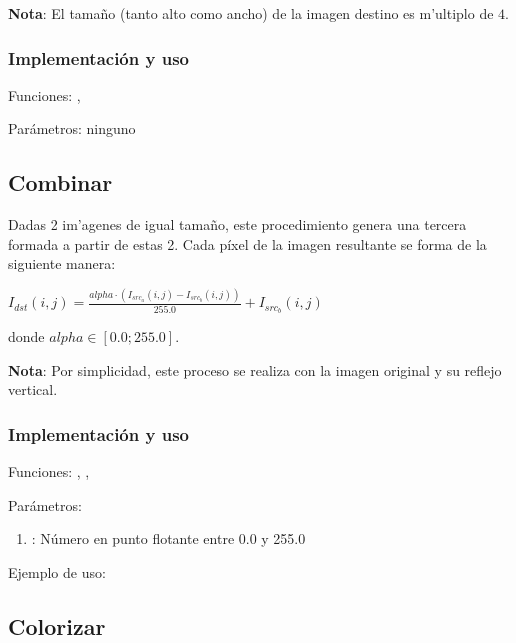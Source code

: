 \begin{framed}
  \noindent \textbf{Nota}: El tama\~no (tanto alto como ancho) de la imagen 
  destino es m'ultiplo de $4$.
\end{framed}

\subsubsection*{Implementación y uso}

\noindent Funciones: , 

\noindent Parámetros: ninguno

\subsection{Combinar}

Dadas 2 im'agenes de igual tama\~no, este procedimiento genera una tercera 
formada a partir de estas 2. Cada píxel de la imagen resultante se forma de la 
siguiente manera:

\begin{center}
  $ I_{dst}(i,j) =  \frac{alpha \cdot (I_{src_{a}}(i,j) - 
    I_{src_{b}}(i,j))}{255.0} + I_{src_{b}}(i,j) $
\end{center}

donde $alpha \in [0.0; 255.0]$.\\

\begin{framed}
  \noindent \textbf{Nota}: Por simplicidad, este proceso se realiza con la 
  imagen original y su reflejo vertical.
\end{framed}

\subsubsection*{Implementación y uso}

\noindent Funciones: , ,

\noindent Parámetros: 

\begin{enumerate}[-]
\item {}: Número en punto flotante entre 0.0 y 255.0
\end{enumerate}

\noindent Ejemplo de uso: 

\subsection{Colorizar}

